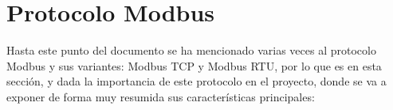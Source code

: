 

\section{Protocolo Modbus}
\label{sec:modbus}

Hasta este punto del documento se ha mencionado varias veces al protocolo Modbus y sus variantes: Modbus TCP y Modbus RTU, por lo que es en esta sección, y dada la importancia de este protocolo en el proyecto, donde se va a exponer de forma muy resumida sus características principales:

